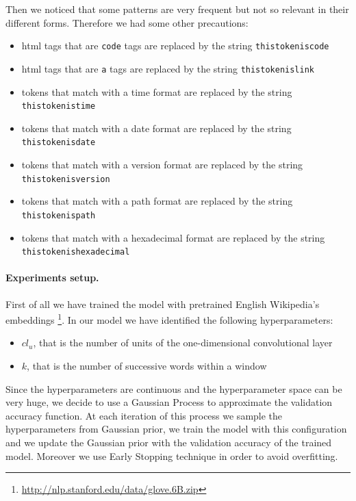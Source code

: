 \documentclass[10pt,twocolumn,letterpaper]{article}
\begin{document}
Then we noticed that some patterns are very frequent but not so relevant in their different forms. Therefore we had some other precautions:
\begin{itemize}
	\item html tags that are \texttt{code} tags are replaced by the string \texttt{thistokeniscode}
	\item html tags that are \texttt{a} tags are replaced by the string \texttt{thistokenislink}
	\item tokens that match with a time format are replaced by the string \texttt{thistokenistime}
	\item tokens that match with a date format are replaced by the string \texttt{thistokenisdate}
	\item tokens that match with a version format are replaced by the string \texttt{thistokenisversion}
	\item tokens that match with a path format are replaced by the string \texttt{thistokenispath}
	\item tokens that match with a hexadecimal format are replaced by the string \texttt{thistokenishexadecimal}
 \end{itemize}
 
\paragraph{Experiments setup.}
First of all we have trained the model with pretrained English Wikipedia's embeddings \footnote{\url{http://nlp.stanford.edu/data/glove.6B.zip}}. In our model we have identified the following hyperparameters: 
\begin{itemize}
	\item $cl_{u}$, that is the number of units of the one-dimensional convolutional layer
	\item $k$, that is the number of successive words within a window
\end{itemize}
Since the hyperparameters are continuous and the hyperparameter space can be very huge, we decide to use a Gaussian Process to approximate the validation accuracy function. At each iteration of this process we sample the hyperparameters from Gaussian prior, we train the model with this configuration and we update the Gaussian prior with the validation accuracy of the trained model. Moreover we use Early Stopping technique in order to avoid overfitting. 
\end{document}
